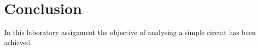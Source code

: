 \section{Conclusion}
\label{sec:conclusion}

In this laboratory assignment the objective of analysing a simple circuit has been
achieved.